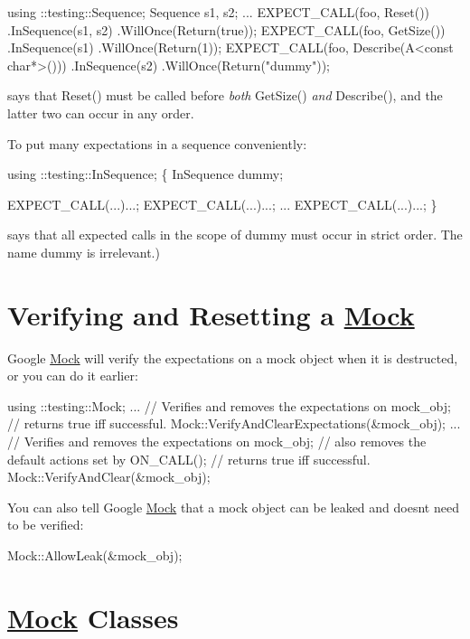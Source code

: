 \begin{DoxyCode}
using ::testing::Sequence;
Sequence s1, s2;
...
EXPECT\_CALL(foo, Reset())
    .InSequence(s1, s2)
    .WillOnce(Return(\textcolor{keyword}{true}));
EXPECT\_CALL(foo, GetSize())
    .InSequence(s1)
    .WillOnce(Return(1));
EXPECT\_CALL(foo, Describe(A<const char*>()))
    .InSequence(s2)
    .WillOnce(Return(\textcolor{stringliteral}{"dummy"}));
\end{DoxyCode}
 says that {\ttfamily Reset()} must be called before {\itshape both} {\ttfamily Get\+Size()} {\itshape and} {\ttfamily Describe()}, and the latter two can occur in any order.

To put many expectations in a sequence conveniently\+: 
\begin{DoxyCode}
using ::testing::InSequence;
\{
  InSequence dummy;

  EXPECT\_CALL(...)...;
  EXPECT\_CALL(...)...;
  ...
  EXPECT\_CALL(...)...;
\}
\end{DoxyCode}
 says that all expected calls in the scope of {\ttfamily dummy} must occur in strict order. The name {\ttfamily dummy} is irrelevant.)

\section*{Verifying and Resetting a \hyperlink{classMock}{Mock}}

Google \hyperlink{classMock}{Mock} will verify the expectations on a mock object when it is destructed, or you can do it earlier\+: 
\begin{DoxyCode}
using ::testing::Mock;
...
\textcolor{comment}{// Verifies and removes the expectations on mock\_obj;}
\textcolor{comment}{// returns true iff successful.}
Mock::VerifyAndClearExpectations(&mock\_obj);
...
\textcolor{comment}{// Verifies and removes the expectations on mock\_obj;}
\textcolor{comment}{// also removes the default actions set by ON\_CALL();}
\textcolor{comment}{// returns true iff successful.}
Mock::VerifyAndClear(&mock\_obj);
\end{DoxyCode}


You can also tell Google \hyperlink{classMock}{Mock} that a mock object can be leaked and doesn\textquotesingle{}t need to be verified\+: 
\begin{DoxyCode}
Mock::AllowLeak(&mock\_obj);
\end{DoxyCode}


\section*{\hyperlink{classMock}{Mock} Classes}

